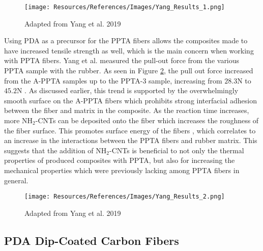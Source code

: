 \documentclass[12pt]{article}
\begin{document}
\begin{multicols}{2}
\begin{figure}[H]
    \centering
    \texttt{[image: Resources/References/Images/Yang\_Results\_1.png]}
    \caption{\scriptsize{Adapted from Yang et al. 2019 \citep{Yang2019}}}
    \label{fig:Yang_Results_1}
\end{figure}

\indent Using PDA as a precursor for the PPTA fibers allows the composites made to have increased tensile strength as well, which is the main concern when working with PPTA fibers. Yang et al. \citep{Yang2019} measured the pull-out force from the various PPTA sample with the rubber. As seen in Figure \ref{fig:Yang_Results_2}, the pull out force increased from the A-PPTA samples up to the PPTA-3 sample, increasing from $28.3$N to $45.2$N \citep{Yang2019}. As discussed earlier, this trend is supported by the overwhelmingly smooth surface on the A-PPTA fibers which prohibits strong interfacial adhesion between the fiber and matrix in the composite. As the reaction time increases, more NH$_2$-CNTs can be deposited onto the fiber which increases the roughness of the fiber surface. This promotes surface energy of the fibers \citep{Yang2019}, which correlates to an increase in the interactions between the PPTA fibers and rubber matrix. This suggests that the addition of NH$_2$-CNTs is beneficial to not only the thermal properties of produced composites with PPTA, but also for increasing the mechanical properties which were previously lacking among PPTA fibers in general.

\begin{figure}[H]
    \centering
    \texttt{[image: Resources/References/Images/Yang\_Results\_2.png]}
    \caption{\scriptsize{Adapted from Yang et al. 2019 \citep{Yang2019}}}
    \label{fig:Yang_Results_2}
\end{figure}

\subsection{PDA Dip-Coated Carbon Fibers}


\end{multicols}
\end{document}
